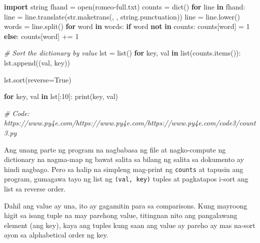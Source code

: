 \documentclass[10pt,]{book}
\newenvironment{Shaded}{}{}
\newcommand{\BuiltInTok}[1]{\textcolor[rgb]{0.00,0.50,0.00}{#1}}
\newcommand{\CommentTok}[1]{\textcolor[rgb]{0.38,0.63,0.69}{\textit{#1}}}
\newcommand{\ControlFlowTok}[1]{\textcolor[rgb]{0.00,0.44,0.13}{\textbf{#1}}}
\newcommand{\DecValTok}[1]{\textcolor[rgb]{0.25,0.63,0.44}{#1}}
\newcommand{\ImportTok}[1]{\textcolor[rgb]{0.00,0.50,0.00}{\textbf{#1}}}
\newcommand{\KeywordTok}[1]{\textcolor[rgb]{0.00,0.44,0.13}{\textbf{#1}}}
\newcommand{\NormalTok}[1]{#1}
\newcommand{\OperatorTok}[1]{\textcolor[rgb]{0.40,0.40,0.40}{#1}}
\newcommand{\StringTok}[1]{\textcolor[rgb]{0.25,0.44,0.63}{#1}}
\newcommand{\VariableTok}[1]{\textcolor[rgb]{0.10,0.09,0.49}{#1}}
\begin{document}
\begin{Shaded}
\begin{Highlighting}[]
\ImportTok{import}\NormalTok{ string}
\NormalTok{fhand }\OperatorTok{=} \BuiltInTok{open}\NormalTok{(}\StringTok{\textquotesingle{}romeo{-}full.txt\textquotesingle{}}\NormalTok{)}
\NormalTok{counts }\OperatorTok{=} \BuiltInTok{dict}\NormalTok{()}
\ControlFlowTok{for}\NormalTok{ line }\KeywordTok{in}\NormalTok{ fhand:}
\NormalTok{    line }\OperatorTok{=}\NormalTok{ line.translate(}\BuiltInTok{str}\NormalTok{.maketrans(}\StringTok{\textquotesingle{}\textquotesingle{}}\NormalTok{, }\StringTok{\textquotesingle{}\textquotesingle{}}\NormalTok{, string.punctuation))}
\NormalTok{    line }\OperatorTok{=}\NormalTok{ line.lower()}
\NormalTok{    words }\OperatorTok{=}\NormalTok{ line.split()}
    \ControlFlowTok{for}\NormalTok{ word }\KeywordTok{in}\NormalTok{ words:}
        \ControlFlowTok{if}\NormalTok{ word }\KeywordTok{not} \KeywordTok{in}\NormalTok{ counts:}
\NormalTok{            counts[word] }\OperatorTok{=} \DecValTok{1}
        \ControlFlowTok{else}\NormalTok{:}
\NormalTok{            counts[word] }\OperatorTok{+=} \DecValTok{1}

\CommentTok{\# Sort the dictionary by value}
\NormalTok{lst }\OperatorTok{=} \BuiltInTok{list}\NormalTok{()}
\ControlFlowTok{for}\NormalTok{ key, val }\KeywordTok{in} \BuiltInTok{list}\NormalTok{(counts.items()):}
\NormalTok{    lst.append((val, key))}

\NormalTok{lst.sort(reverse}\OperatorTok{=}\VariableTok{True}\NormalTok{)}

\ControlFlowTok{for}\NormalTok{ key, val }\KeywordTok{in}\NormalTok{ lst[:}\DecValTok{10}\NormalTok{]:}
    \BuiltInTok{print}\NormalTok{(key, val)}

\CommentTok{\# Code: https://www.py4e.com/https://www.py4e.com/https://www.py4e.com/code3/count3.py}
\end{Highlighting}
\end{Shaded}


Ang unang parte ng program na nagbabasa ng file at nagko-compute ng
dictionary na nagma-map ng bawat salita sa bilang ng salita sa dokumento
ay hindi nagbago. Pero sa halip na simpleng mag-print ng \texttt{counts}
at tapusin ang program, gumagawa tayo ng list ng \texttt{(val,\ key)}
tuples at pagkatapos i-sort ang list sa reverse order.

Dahil ang value ay una, ito ay gagamitin para sa comparisons. Kung
mayroong higit sa isang tuple na may parehong value, titingnan nito ang
pangalawang element (ang key), kaya ang tuples kung saan ang value ay
pareho ay mas na-sort ayon sa alphabetical order ng key.
\end{document}
